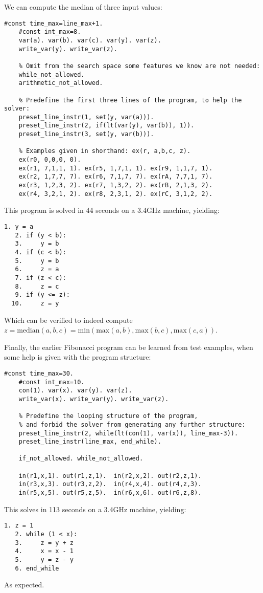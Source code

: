 \documentclass[a4paper,twoside,notitlepage]{article}
\begin{document}
We can compute the median of three input values:
\begin{Verbatim}[samepage=true]
    #const time_max=line_max+1.
    #const int_max=8.
    var(a). var(b). var(c). var(y). var(z).
    write_var(y). write_var(z).
    
    % Omit from the search space some features we know are not needed:
    while_not_allowed.
    arithmetic_not_allowed.
    
    % Predefine the first three lines of the program, to help the solver:
    preset_line_instr(1, set(y, var(a))).
    preset_line_instr(2, if(lt(var(y), var(b)), 1)).
    preset_line_instr(3, set(y, var(b))).
    
    % Examples given in shorthand: ex(r, a,b,c, z).
    ex(r0, 0,0,0, 0).
    ex(r1, 7,1,1, 1). ex(r5, 1,7,1, 1). ex(r9, 1,1,7, 1).
    ex(r2, 1,7,7, 7). ex(r6, 7,1,7, 7). ex(rA, 7,7,1, 7).
    ex(r3, 1,2,3, 2). ex(r7, 1,3,2, 2). ex(rB, 2,1,3, 2).
    ex(r4, 3,2,1, 2). ex(r8, 2,3,1, 2). ex(rC, 3,1,2, 2).
\end{Verbatim}
This program is solved in 44 seconds on a 3.4GHz machine, yielding:
\begin{Verbatim}[samepage=true]
   1. y = a
   2. if (y < b):
   3.     y = b
   4. if (c < b):
   5.     y = b
   6.     z = a
   7. if (z < c):
   8.     z = c
   9. if (y <= z):
  10.     z = y
\end{Verbatim}
Which can be verified to indeed compute $z = \textrm{median}(a,b,c) = 
\textrm{min}(\textrm{max}(a,b), \textrm{max}(b,c), \textrm{max}(c,a))$.

Finally, the earlier Fibonacci program can be learned from test examples, 
when some help is given with the program structure:
\begin{Verbatim}[samepage=true]
    #const time_max=30.
    #const int_max=10.
    con(1). var(x). var(y). var(z).
    write_var(x). write_var(y). write_var(z).
    
    % Predefine the looping structure of the program,
    % and forbid the solver from generating any further structure:
    preset_line_instr(2, while(lt(con(1), var(x)), line_max-3)).
    preset_line_instr(line_max, end_while).
    
    if_not_allowed. while_not_allowed.
    
    in(r1,x,1). out(r1,z,1).  in(r2,x,2). out(r2,z,1).
    in(r3,x,3). out(r3,z,2).  in(r4,x,4). out(r4,z,3).
    in(r5,x,5). out(r5,z,5).  in(r6,x,6). out(r6,z,8).
\end{Verbatim}
This solves in 113 seconds on a 3.4GHz machine, yielding:
\begin{Verbatim}[samepage=true]
   1. z = 1
   2. while (1 < x):
   3.     z = y + z
   4.     x = x - 1
   5.     y = z - y
   6. end_while
\end{Verbatim}
As expected.
\end{document}

